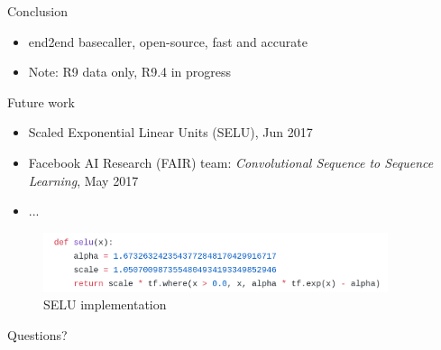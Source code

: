 \documentclass[10pt]{beamer}
\begin{document}
\begin{frame}[fragile]{Conclusion}
	\begin{itemize}
		\item end2end basecaller, open-source, fast and accurate
		\item \alert{Note:} R9 data only, R9.4 in progress
	\end{itemize}
\end{frame}

\begin{frame}[fragile]{Future work}
	\begin{itemize}
		\item<1-> Scaled Exponential Linear Units (SELU), Jun 2017
		\item<3-> Facebook AI Research (FAIR) team: \textit{Convolutional Sequence to Sequence Learning}, May 2017
		\item<4-> ...
	\end{itemize}
	
	 {
		\begin{figure}

			\begin{center}
				\includegraphics[width=0.9\textwidth]{./imgs/selu_tf_exp.png}%
				\caption{SELU implementation}				
			\end{center}
		\end{figure}
	}
\end{frame}


\begin{frame}[standout]
	Questions?
\end{frame}	
\end{document}
